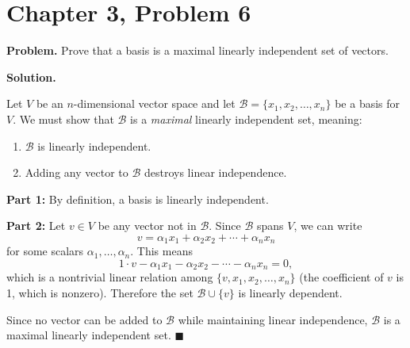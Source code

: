 \documentclass[12pt]{article}
\begin{document}
\section*{Chapter 3, Problem 6}

\textbf{Problem.} Prove that a basis is a maximal linearly independent set of vectors.

\bigskip
\textbf{Solution.}

Let $V$ be an $n$-dimensional vector space and let $\mathcal{B} = \{x_1, x_2, \ldots, x_n\}$ be a basis for $V$. We must show that $\mathcal{B}$ is a \emph{maximal} linearly independent set, meaning:
\begin{enumerate}
    \item $\mathcal{B}$ is linearly independent.
    \item Adding any vector to $\mathcal{B}$ destroys linear independence.
\end{enumerate}

\medskip
\textbf{Part 1:} By definition, a basis is linearly independent.

\medskip
\textbf{Part 2:} Let $v \in V$ be any vector not in $\mathcal{B}$. Since $\mathcal{B}$ spans $V$, we can write
\[
v = \alpha_1 x_1 + \alpha_2 x_2 + \cdots + \alpha_n x_n
\]
for some scalars $\alpha_1, \ldots, \alpha_n$. This means
\[
1 \cdot v - \alpha_1 x_1 - \alpha_2 x_2 - \cdots - \alpha_n x_n = 0,
\]
which is a nontrivial linear relation among $\{v, x_1, x_2, \ldots, x_n\}$ (the coefficient of $v$ is 1, which is nonzero). Therefore the set $\mathcal{B} \cup \{v\}$ is linearly dependent.

Since no vector can be added to $\mathcal{B}$ while maintaining linear independence, $\mathcal{B}$ is a maximal linearly independent set. \hfill $\blacksquare$
\end{document}
